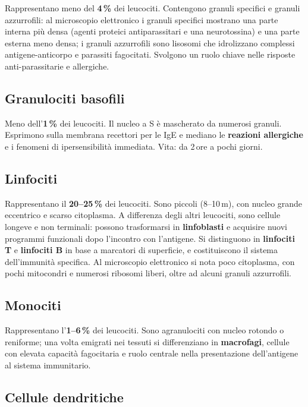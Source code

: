 Rappresentano meno del \textbf{4\,\%} dei leucociti. Contengono granuli
specifici e granuli azzurrofili: al microscopio elettronico i granuli
specifici mostrano una parte interna più densa (agenti proteici
antiparassitari e una neurotossina) e una parte esterna meno densa; i granuli
azzurrofili sono lisosomi che idrolizzano complessi antigene-anticorpo e
parassiti fagocitati. Svolgono un ruolo chiave nelle risposte
anti-parassitarie e allergiche.

\subsection{Granulociti basofili}

Meno dell'\textbf{1\,\%} dei leucociti. Il nucleo a S è mascherato da numerosi
granuli. Esprimono sulla membrana recettori per le IgE e mediano le
\textbf{reazioni allergiche} e i fenomeni di ipersensibilità immediata. Vita:
da 2\,ore a pochi giorni.

\subsection{Linfociti}

Rappresentano il \textbf{20--25\,\%} dei leucociti. Sono piccoli (8--10\,\textmu m),
con nucleo grande eccentrico e scarso citoplasma. A differenza degli altri
leucociti, sono cellule longeve e non terminali: possono trasformarsi in
\textbf{linfoblasti} e acquisire nuovi programmi funzionali dopo l'incontro con
l'antigene. Si distinguono in \textbf{linfociti T} e \textbf{linfociti B} in
base a marcatori di superficie, e costituiscono il sistema dell'immunità
specifica. Al microscopio elettronico si nota poco citoplasma, con pochi
mitocondri e numerosi ribosomi liberi, oltre ad alcuni granuli azzurrofili.

\subsection{Monociti}

Rappresentano l'\textbf{1--6\,\%} dei leucociti. Sono agranulociti con nucleo
rotondo o reniforme; una volta emigrati nei tessuti si differenziano in
\textbf{macrofagi}, cellule con elevata capacità fagocitaria e ruolo centrale
nella presentazione dell'antigene al sistema immunitario.

\subsection{Cellule dendritiche}

